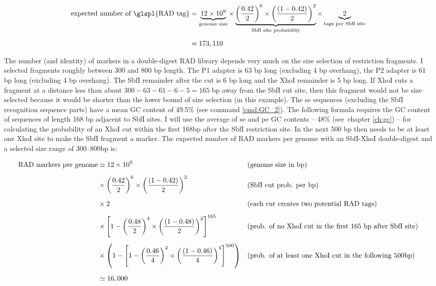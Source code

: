 \documentclass[a4paper,12pt,times,print,index, custombib]{PhDThesisPSnPDF}\usepackage[]{graphicx}\usepackage[]{color}
\begin{document}
\scriptsize
\begin{align}
\text{expected number of \glspl{RAD tag}} &= \underbrace{12 \times 10^{9}}_{\text{genome size}} \times 
\underbrace{ \left( \frac{0.42}{2}\right)^{6} \times \left( \frac{(1-0.42)}{2} \right)^{2} }_{\text{SbfI site probability}} \times 
\underbrace{2}_{\text{tags per SbfI site}}
\label{eq:exp_num_standard_RAD_loci} \\[5pt] 
&= 173,110 \nonumber
\end{align}
\normalsize

The number (and identity) of markers in a double-digest RAD library depends very much on the size selection of restriction fragments. I selected fragments roughly between 300 and 800 \gls{bp} length. The P1 adapter is 63 bp long (excluding 4 bp overhang), the P2 adapter is 61 bp long (excluding 4 bp overhang). The \gls{SbfI} remainder after the cut is 6 \gls{bp} long and the \gls{XhoI} remainder is 5 \gls{bp} long. If \gls{XhoI} cuts a fragment at a distance less than about $300 - 63 - 61 -6 -5 = 165$ \gls{bp} away from the SbfI cut site, then this fragment would not be size selected because it would be shorter than the lower bound of size selection (in this example). The \gls{se} sequences (excluding the SbfI recognition sequence parts) have a mean GC content of 49.5\% (see command \ref{cmd:GC_2}). 
The following formula requires the GC content of sequences of length 168 \gls{bp} adjacent to SbfI sites. I will use the average of \gls{se} and \gls{pe} GC contents -- 48\% (see~chapter \ref{ch:gc}) -- for calculating the probability of an XhoI cut within the first 168bp after the SbfI restriction site. In the next 500 \gls{bp} then needs to be at least one \gls{XhoI} site to make the SbfI fragment a marker.
The expected number of RAD markers per genome with an SbfI-XhoI double-digest and a selected size range of 300--800bp is:


\scriptsize
\begin{align} %
\text{RAD markers per genome} &\simeq 12 \times 10^{9} 
	&&\text{(genome size in bp)}  \label{eq:exp_number_ddRAD_loci} \\[5pt]
&\times \left(\frac{0.42}{2}\right)^{6}\times \left(\frac{(1-0.42)}{2}\right)^{2} &&\text{(SbfI cut prob. per bp)} \notag \\[5pt]
&\times 2 
	&&\text{(each cut creates two potential RAD tags)} \notag \\[5pt]
&\times \left[1-\left(\frac{0.48}{2}\right)^{4} \times \left( \frac{(1-0.48)}{2}\right)^{2} \right]^{165} 
	&&\text{(prob. of no XhoI cut in the first 165 bp after SbfI site)} \notag \\[5pt]
&\times \left(1- \left[1-\left(\frac{0.46}{4}\right)^{2} \times \left( \frac{(1-0.46)}{4}\right)^{4} \right]^{500} \right) 
	&&\text{(prob. of at least one XhoI cut in the following 500bp)} \notag \\[5pt]
&\simeq 16,000 \nonumber
\end{align}
\normalsize
\end{document}
